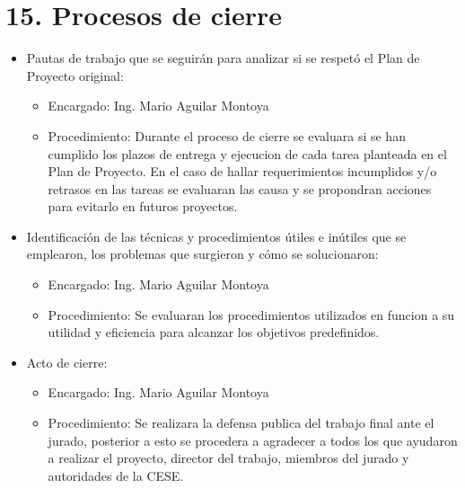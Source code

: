 \documentclass[
11pt, %
codirector, %
]{charter}
\begin{document}
\section{15. Procesos de cierre}    
\label{sec:cierre}

\begin{itemize}
	\item Pautas de trabajo que se seguirán para analizar si se respetó el Plan de Proyecto original:
	\begin{itemize}
		\item Encargado: Ing. Mario Aguilar Montoya
		\item Procedimiento: Durante el proceso de cierre se evaluara si se han cumplido los plazos
		de entrega y ejecucion de cada tarea planteada en el Plan de Proyecto. En el caso de hallar requerimientos incumplidos y/o retrasos en las
		tareas se evaluaran las causa y se propondran acciones para evitarlo en futuros
		proyectos.
	\end{itemize}
	\item Identificación de las técnicas y procedimientos útiles e inútiles que se emplearon, los problemas que surgieron y cómo se solucionaron:
	\begin{itemize}
		\item Encargado: Ing. Mario Aguilar Montoya
		\item Procedimiento: Se evaluaran los procedimientos utilizados en funcion a su utilidad
		y eficiencia para alcanzar los objetivos predefinidos.
	\end{itemize}
	\item Acto de cierre:
	\begin{itemize}
		\item Encargado: Ing. Mario Aguilar Montoya
		\item Procedimiento: Se realizara la defensa publica del trabajo final ante el jurado, posterior a esto se
		procedera a agradecer a todos los que ayudaron a realizar el proyecto, director del
		trabajo, miembros del jurado y autoridades de la CESE.
	\end{itemize}
\end{itemize}
\end{document}
